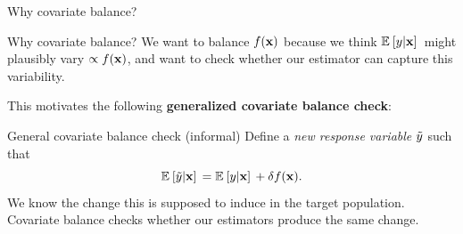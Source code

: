 \begin{frame}[t]{Why covariate balance?}

%

\begin{alertblock}{Why covariate balance?}
We want to balance $f(\mathbf{x})$ because we think
$\mathbb{E}_{}\left[ y \vert \mathbf{x}\right]\,$ might plausibly vary $\propto f(\mathbf{x})$,
and want to check whether our estimator can capture this variability.
\end{alertblock}


This motivates the following \textbf{generalized covariate balance check}:

\begin{block}{General covariate balance check (informal)}
    Define a \emph{new response variable} $\tilde{y}$ such that
    $$
    \mathbb{E}_{}\left[ \tilde{y} \vert \mathbf{x}\right]\, = \mathbb{E}_{}\left[ y \vert \mathbf{x}\right]\, + \delta f(\mathbf{x}).
    $$
    We know the change this is supposed to induce in the target population.\\[1em]

    Covariate balance checks whether our estimators produce the same change.
\end{block}


\end{frame}


